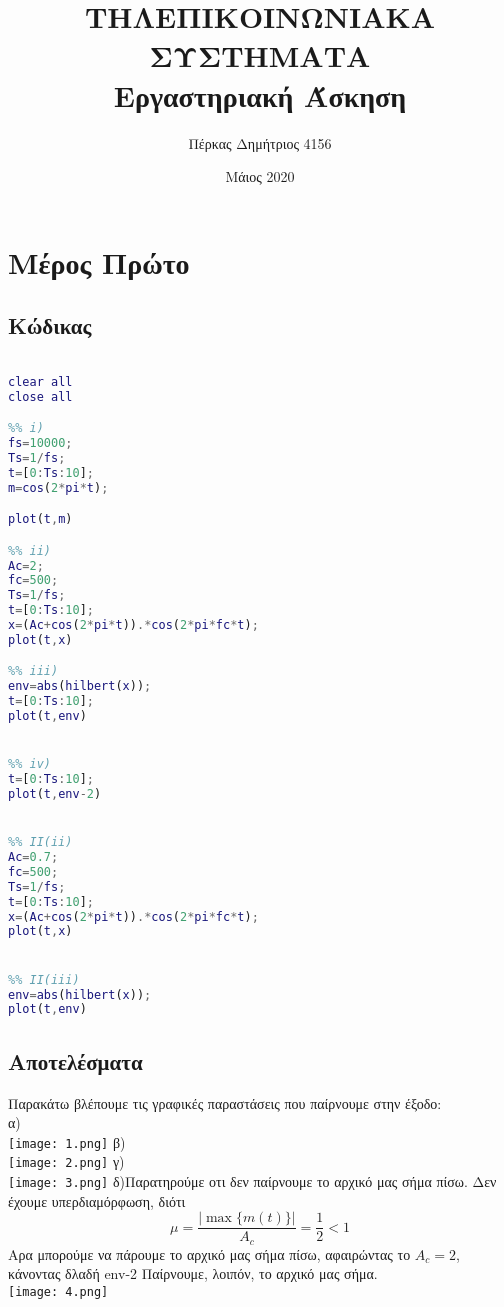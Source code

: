 \documentclass{article}
\begin{document}
\title{ΤΗΛΕΠΙΚΟΙΝΩΝΙΑΚΑ ΣΥΣΤΗΜΑΤΑ \\Εργαστηριακή Άσκηση}
\author{Πέρκας Δημήτριος 4156}
\date{Μάιος 2020}

\maketitle

\pagebreak


\tableofcontents
\newpage


\section{Μέρος Πρώτο}

\subsection{Κώδικας }
\begin{otherlanguage}{english}
\begin{lstlisting}[language=MATLAB, caption= \foreignlanguage{greek}{Μέρος Πρώτο}  ]
%PERKAS DIMITRIOS 4156

clear all
close all

%% i)
fs=10000;
Ts=1/fs;
t=[0:Ts:10];
m=cos(2*pi*t);

plot(t,m)

%% ii)
Ac=2;
fc=500;
Ts=1/fs;
t=[0:Ts:10];
x=(Ac+cos(2*pi*t)).*cos(2*pi*fc*t);
plot(t,x)

%% iii)
env=abs(hilbert(x));
t=[0:Ts:10];
plot(t,env)


%% iv)
t=[0:Ts:10];
plot(t,env-2)


%% II(ii)
Ac=0.7;
fc=500;
Ts=1/fs;
t=[0:Ts:10];
x=(Ac+cos(2*pi*t)).*cos(2*pi*fc*t);
plot(t,x)


%% II(iii)
env=abs(hilbert(x));
plot(t,env)


\end{lstlisting}
\end{otherlanguage}

\pagebreak

\subsection{Αποτελέσματα}
Παρακάτω βλέπουμε τις γραφικές παραστάσεις που παίρνουμε στην έξοδο:\\
α)\\
\texttt{[image: 1.png]}
β)\\
\texttt{[image: 2.png]}
γ)\\
\texttt{[image: 3.png]}
δ)Παρατηρούμε οτι δεν παίρνουμε το αρχικό μας σήμα πίσω. Δεν έχουμε υπερδιαμόρφωση, διότι
\[\mu=\frac{|\max\{m(t)\}|}{A_c}=\frac{1}{2}<1 \]
Αρα μπορούμε να πάρουμε το αρχικό μας σήμα πίσω, αφαιρώντας το $A_c=2$, κάνοντας δλαδή \foreignlanguage{english}{env-2}
Παίρνουμε, λοιπόν, το αρχικό μας σήμα.\\
\texttt{[image: 4.png]}
\pagebreak
\end{document}
